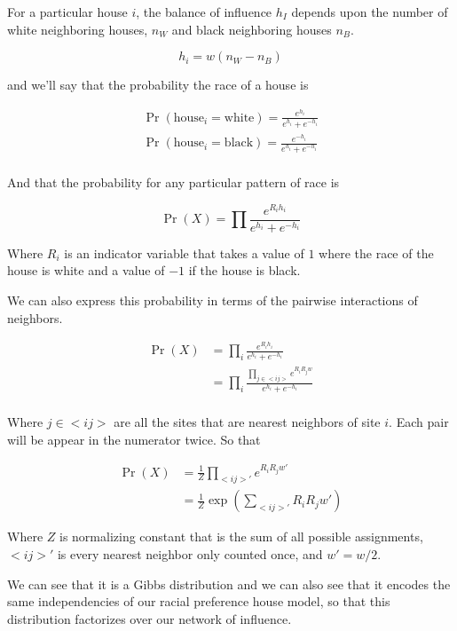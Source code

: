 \documentclass{article}
\begin{document}
For a particular house $i$, the balance of influence $h_I$ depends upon the
number of white neighboring houses, $n_W$ and black neighboring houses $n_B$.

\begin{equation}
h_i = w(n_W - n_B)
\end{equation}

and we'll say that the probability the race of a house is

\begin{align}
\Pr(\text{house}_i = \text{white}) = \frac{e^{h_i}}{e^{h_i} + e^{-h_i}} \\
\Pr(\text{house}_i = \text{black}) = \frac{e^{-h_i}}{e^{h_i} + e^{-h_i}} \\
\end{align}

And that the probability for any particular pattern of race is

\begin{equation}
\Pr(X) = \prod\frac{e^{R_ih_i}}{e^{h_i} + e^{-h_i}}
\end{equation}

Where $R_i$ is an indicator variable that takes a value of
$1$ where the race of the house is white and a value of $-1$ if the
house is black.

We can also express this probability in terms of the pairwise interactions 
of neighbors.

\begin{align}
\Pr(X) &= \prod_i\frac{e^{R_ih_i}}{e^{h_i} + e^{-h_i}} \\
&= \prod_i\frac{\prod_{j \in <i j>}e^{R_iR_jw}}{e^{h_i} + e^{-h_i}} \\
\end{align}

Where $j \in <i j>$ are all the sites that are nearest neighbors of site $i$. Each pair will be appear in the numerator twice. So that 

\begin{align}
\Pr(X) &= \frac{1}{Z}\prod_{<i j>'}e^{R_iR_jw'} \\
&= \frac{1}{Z}\operatorname{exp}(\sum_{<i j>'}R_iR_jw') 
\end{align}

Where $Z$ is normalizing constant that is the sum of all possible assignments, 
$<i j>'$ is every nearest neighbor only counted once, and $w' = w/2$.

We can see that it is a Gibbs distribution and we can also see that it
encodes the same independencies of our racial preference house model,
so that this distribution factorizes over our network of influence.
\end{document}
